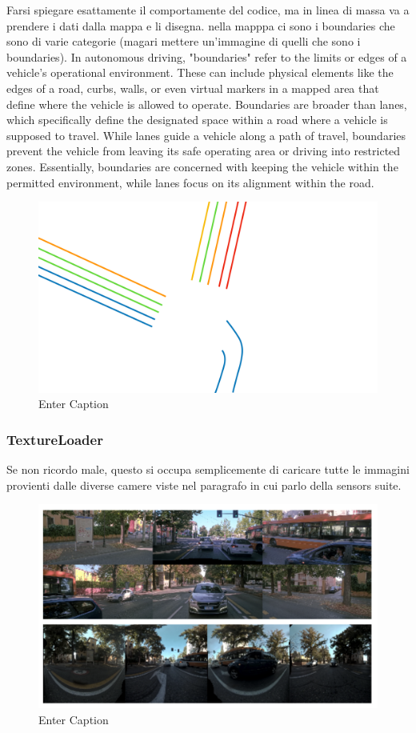 Farsi spiegare esattamente il comportamente del codice, ma in linea di massa va a prendere i dati dalla mappa e li disegna. nella mapppa ci sono i boundaries che sono di varie categorie (magari mettere un'immagine di quelli che sono i boundaries). 
In autonomous driving, "boundaries" refer to the limits or edges of a vehicle's operational environment. These can include physical elements like the edges of a road, curbs, walls, or even virtual markers in a mapped area that define where the vehicle is allowed to operate. Boundaries are broader than lanes, which specifically define the designated space within a road where a vehicle is supposed to travel. While lanes guide a vehicle along a path of travel, boundaries prevent the vehicle from leaving its safe operating area or driving into restricted zones. Essentially, boundaries are concerned with keeping the vehicle within the permitted environment, while lanes focus on its alignment within the road.

\begin{figure}
    \centering
    \includegraphics[width=0.75\linewidth]{LateX//figs/mappaHD.pdf}
    \caption{Enter Caption}
    \label{fig:enter-label}
\end{figure}

\subsubsection{TextureLoader}
Se non ricordo male, questo si occupa semplicemente di caricare tutte le immagini provienti dalle diverse camere viste nel paragrafo in cui parlo della sensors suite. 

\begin{figure}
    \centering
    \includegraphics[width=1\linewidth]{LateX//figs/Screenshot 2024-09-27 at 12.00.55.png}
    \caption{Enter Caption}
    \label{fig:enter-label}
\end{figure}

